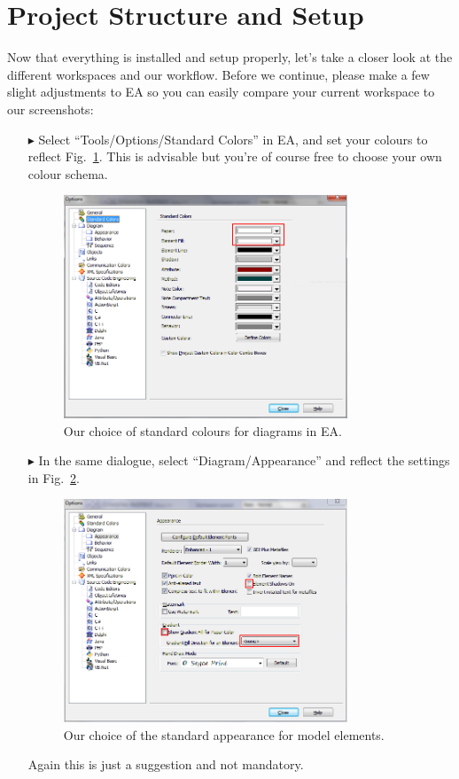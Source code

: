 \section{Project Structure and Setup}
Now that everything is installed and setup properly, let's take a closer look at the different workspaces and our workflow.
Before we continue, please make a few slight adjustments to EA so you can easily compare your current workspace to our screenshots:
\begin{itemize} 

\item[$\blacktriangleright$] Select ``Tools/Options/Standard Colors'' in EA, and set your colours to reflect Fig.~\ref{fig_standardColoursEA}.
This is advisable but you're of course free to choose your own colour schema.
\begin{figure}[htbp]
  \centering
  \includegraphics[width=0.8\textwidth]{pics/installationAndSetup/standardColours}
  \caption{Our choice of standard colours for diagrams in EA.}
  \label{fig_standardColoursEA}
\end{figure}

\item[$\blacktriangleright$] In the same dialogue, select ``Diagram/Appearance'' and reflect the settings in Fig.~\ref{fig_standardAppearanceEA}.
\begin{figure}[htbp]
  \centering
  \includegraphics[width=0.8\textwidth]{pics/installationAndSetup/standardAppearance}
  \caption{Our choice of the standard appearance for model elements.}
  \label{fig_standardAppearanceEA}
\end{figure}
Again this is just a suggestion and not mandatory.


\end{itemize}
